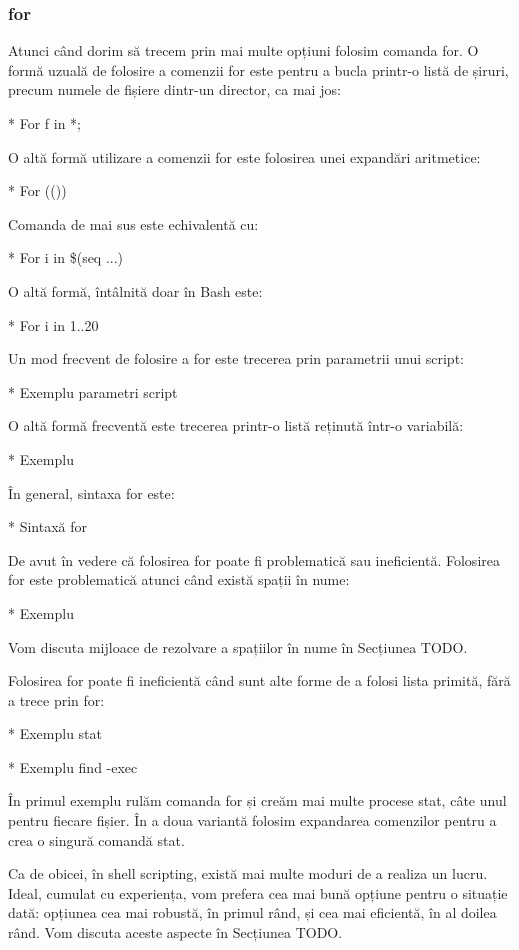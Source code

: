 \subsubsection{for}
\label{sec:script-func-flux-for}

Atunci când dorim să trecem prin mai multe opțiuni folosim comanda for. O formă
uzuală de folosire a comenzii for este pentru a bucla printr-o listă de șiruri,
precum numele de fișiere dintr-un director, ca mai jos:

* For f in *;

O altă formă utilizare a comenzii for este folosirea unei expandări aritmetice:

* For (())

Comanda de mai sus este echivalentă cu:

* For i in \$(seq ...)

O altă formă, întâlnită doar în Bash este:

* For i in {1..20}

Un mod frecvent de folosire a for este trecerea prin parametrii unui script:

* Exemplu parametri script

O altă formă frecventă este trecerea printr-o listă reținută într-o variabilă:

* Exemplu

În general, sintaxa for este:

* Sintaxă for

De avut în vedere că folosirea for poate fi problematică sau ineficientă.
Folosirea for este problematică atunci când există spații în nume:

* Exemplu

Vom discuta mijloace de rezolvare a spațiilor în nume în Secțiunea TODO.

Folosirea for poate fi ineficientă când sunt alte forme de a folosi lista
primită, fără a trece prin for:

* Exemplu stat

* Exemplu find -exec

În primul exemplu rulăm comanda for și creăm mai multe procese stat, câte unul
pentru fiecare fișier. În a doua variantă folosim expandarea comenzilor pentru a
crea o singură comandă stat.

Ca de obicei, în shell scripting, există mai multe moduri de a realiza un lucru.
Ideal, cumulat cu experiența, vom prefera cea mai bună opțiune pentru o situație
dată: opțiunea cea mai robustă, în primul rând, și cea mai eficientă, în al
doilea rând. Vom discuta aceste aspecte în Secțiunea TODO.

